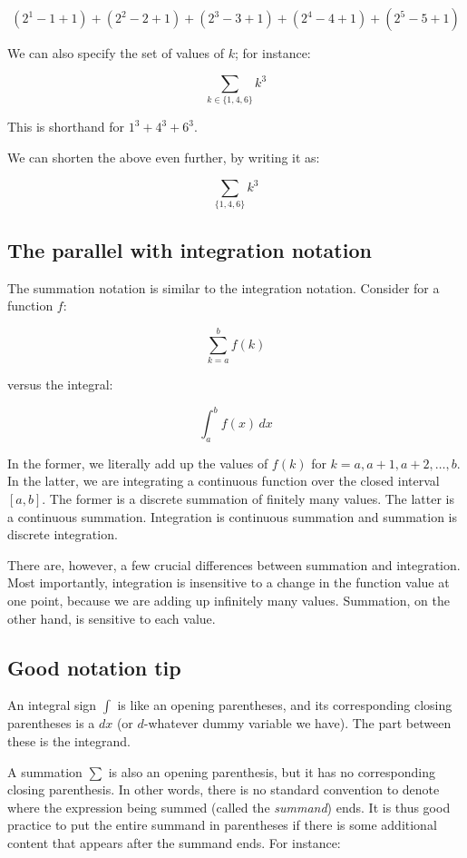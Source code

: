 \documentclass{amsart}
\begin{document}
$$(2^1 - 1 + 1) + (2^2 - 2 + 1) + (2^3 - 3 + 1) + (2^4 - 4 + 1) + (2^5 - 5 + 1)$$

We can also specify the set of values of $k$; for instance:

$$\sum_{k \in \{ 1,4,6 \}} k^3$$

This is shorthand for $1^3 + 4^3 + 6^3$.

We can shorten the above even further, by writing it as:

$$\sum_{\{ 1,4,6 \}} k^3$$

\subsection{The parallel with integration notation}

The summation notation is similar to the integration
notation. Consider for a function $f$:

$$\sum_{k = a}^b f(k)$$

versus the integral:

$$\int_a^b f(x) \, dx$$

In the former, we literally add up the values of $f(k)$ for $k = a,
a+1, a+2, \dots, b$. In the latter, we are integrating a continuous
function over the closed interval $[a,b]$. The former is a discrete
summation of finitely many values. The latter is a continuous
summation. Integration is continuous summation and summation is
discrete integration.

There are, however, a few crucial differences between summation and
integration. Most importantly, integration is insensitive to a change
in the function value at one point, because we are adding up
infinitely many values. Summation, on the other hand, is sensitive to
each value.

\subsection{Good notation tip}

An integral sign $\int$ is like an opening parentheses, and its
corresponding closing parentheses is a $dx$ (or $d$-whatever dummy
variable we have). The part between these is the integrand.

A summation $\sum$ is also an opening parenthesis, but it has no
corresponding closing parenthesis. In other words, there is no
standard convention to denote where the expression being summed
(called the {\em summand}) ends. It is thus good practice to put the
entire summand in parentheses if there is some additional content that
appears after the summand ends. For instance:
\end{document}
